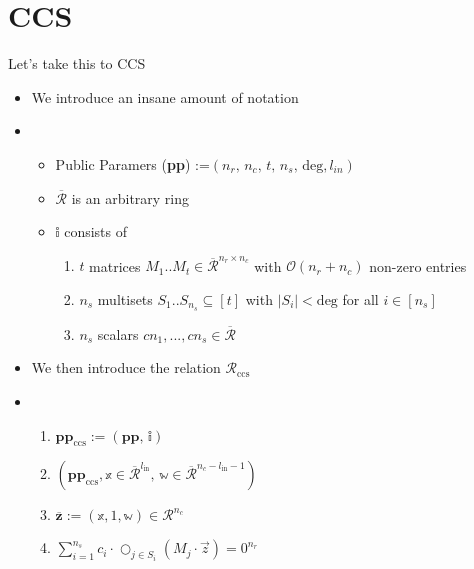 \section{CCS}
\begin{frame}
    {Let's take this to CCS}
    \begin{itemize}
        \item We introduce an insane amount of notation
        \item \begin{itemize}

                  \item Public Paramers (\textbf{pp}) :=$(n_{r}, \, n_{c}, \,t,\,n_{s}, \, \text{deg}, l_{in})$
                  \item $\overline{\mathcal{R}}$ is an arbitrary ring
                  \item $\mathbb{i}$ consists of \begin{enumerate}
                            \item $t$ matrices $M_1..M_t \in \overline{\mathcal{R}}^{n_{r} \times n_{c}}$ with $\mathcal{O}(n_{r} + n_{c})$ non-zero entries
                            \item $n_{s}$ multisets $S_1..S_{n_s} \subseteq [t]$ with $|S_i| < \text{deg}$ for all $i \in [n_s]$
                            \item $n_s$ scalars $c{n_1}, ..., c{n_s} \in \overline{\mathcal{R}}$
                        \end{enumerate}
              \end{itemize}
        \item We then introduce the relation $\mathcal{R}_{\text{ccs}}$
        \item \begin{enumerate}
                  \item $\textbf{pp}_{\text{ccs}}:= (\textbf{pp},\, \mathbb{i})$
                  \item $(\textbf{pp}_{\text{ccs}}, \mathbb{x} \in \overline{\mathcal{R}}^{l_\text{in}},\,\mathbb{w} \in \overline{\mathcal{R}}^{n_c- l_\text{in} -1})$
                  \item $\overline{\textbf{z}} := (\mathbb{x}, 1,\mathbb{w}) \in \mathcal{R}^{n_c}$
                  \item $ \sum_{i=1}^{n_s} c_i \cdot \bigcirc_{j \in S_i} (M_j \cdot \vec{z}) = 0^{n_r}$
              \end{enumerate}
    \end{itemize}


\end{frame}
